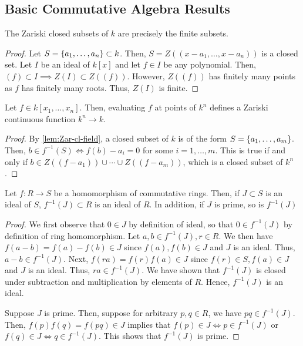 
\subsection{Basic Commutative Algebra Results}

\begin{lem}\label{lem:Zar-cl-field}
The Zariski closed subsets of $k$ are precisely the finite subsets.
\end{lem}
\begin{proof}
Let $S = \set{a_1, \dots, a_n} \subset k$. Then,
$S = Z((x - a_1, \dots, x - a_n))$ is a closed set.
Let $I$ be an ideal of $k[x]$ and let $f \in I$ be any polynomial.
Then, $(f) \subset I \implies Z(I) \subset Z((f))$. However,
$Z((f))$ has finitely many points as $f$ has finitely
many roots. Thus, $Z(I)$ is finite.
\end{proof}

\begin{lem}\label{lem:poly-Zar-cont}
Let $f \in k[x_1, \dots, x_n]$. Then, evaluating $f$ at points of $k^n$
defines a Zariski continuous function $k^n \to k$.
\end{lem}
\begin{proof}
By \cref{lem:Zar-cl-field}, a closed subset of $k$ is of the form
$S = \set{a_1, \dots, a_m}$. Then, $b \in f^{-1}(S) \iff f(b) - a_i = 0$ for
some $i = 1, \dots, m$. This is true if and only if
$b \in Z((f - a_1)) \cup \cdots \cup Z((f - a_m))$, which is a closed
subset of $k^n$.
\end{proof}

\begin{lem}\label{lem:ideal-preim}
Let $f : R \to S$ be a homomorphism of commutative rings.
Then, if $J \subset S$ is an ideal of $S$, $f^{-1}(J) \subset R$
is an ideal of $R$. In addition, if $J$ is prime, so is $f^{-1}(J)$
\end{lem}
\begin{proof}
We first observe that $0 \in J$ by definition of ideal, so that
$0 \in f^{-1}(J)$ by definition of ring homomorphism.
Let $a, b \in f^{-1}(J), r \in R$. We then have
$f(a - b) = f(a) - f(b) \in J$ since $f(a), f(b) \in J$ and
$J$ is an ideal. Thus, $a - b \in f^{-1}(J)$.
Next, $f(ra) = f(r)f(a) \in J$ since $f(r) \in S, f(a) \in J$
and $J$ is an ideal. Thus, $ra \in f^{-1}(J)$.
We have shown that $f^{-1}(J)$ is closed under subtraction and multiplication
by elements of $R$. Hence, $f^{-1}(J)$ is an ideal.

Suppose $J$ is prime. Then, suppose for arbitrary $p, q \in R$, we have
$pq \in f^{-1}(J)$. Then, $f(p)f(q) = f(pq) \in J$ implies that
$f(p) \in J \iff p \in f^{-1}(J)$ or $f(q) \in J \iff q \in f^{-1}(J)$.
This shows that $f^{-1}(J)$ is prime. 
\end{proof}

